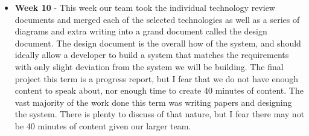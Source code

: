 \documentclass[onecolumn, draftclsnofoot,10pt, compsoc]{IEEEtran}
\begin{document}
\begin{itemize}
					\item \textbf{Week 10} - This week our team took the individual technology review documents and merged each of the selected technologies as well as a series of diagrams and extra writing into a grand document called the design document. The design document is the overall how of the system, and should ideally allow a developer to build a system that matches the requirements with only slight deviation from the system we will be building. The final project this term is a progress report, but I fear that we do not have enough content to speak about, nor enough time to create 40 minutes of content. The vast majority of the work done this term was writing papers and designing the system. There is plenty to discuss of that nature, but I fear there may not be 40 minutes of content given our larger team.
				\end{itemize}
\end{document}
